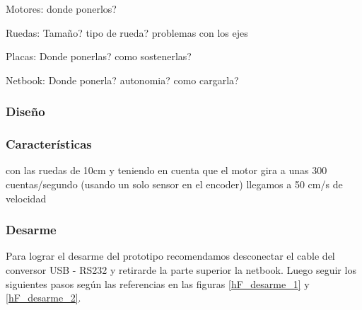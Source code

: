 Motores:
donde ponerlos?

Ruedas:
Tama\~no? tipo de rueda? problemas con los ejes

Placas:
Donde ponerlas? como sostenerlas?

Netbook:
Donde ponerla? autonomia? como cargarla?


\subsubsection{Dise\~no}
\label{h_prototipo_diseno}

\subsubsection{Caracter\'isticas}
\label{h_prototipo_caracteristicas}

con las ruedas de 10cm y teniendo en cuenta que el motor gira a unas 300 cuentas/segundo (usando un solo sensor en el encoder) llegamos a 50 cm/s de velocidad

\subsubsection{Desarme}
\label{h_prototipo_desarme}

Para lograr el desarme del prototipo recomendamos desconectar el cable del conversor USB - RS232 y
retirarde la parte superior la netbook.
Luego seguir los siguientes pasos seg\'un las referencias en las figuras \ref{hF_desarme_1} y \ref{hF_desarme_2}.

